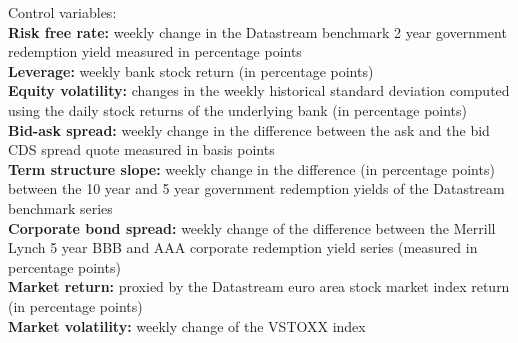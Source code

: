 \noindent
Control variables: \\
\textbf{Risk free rate:} weekly change in the Datastream benchmark 2 year government redemption yield measured in percentage points \\
\textbf{Leverage:} weekly bank stock return (in percentage points) \\
\textbf{Equity volatility:} changes in the weekly historical standard deviation computed using the daily stock returns of the underlying bank (in percentage points) \\
\textbf{Bid-ask spread:} weekly change in the difference between the ask and the bid CDS spread quote measured in basis points \\
\textbf{Term structure slope:} weekly change in the difference (in percentage points) between the 10 year and 5 year government redemption yields of the Datastream benchmark series \\
\textbf{Corporate bond spread:} weekly change of the difference between the Merrill Lynch 5 year BBB and AAA corporate redemption yield series (measured in percentage points) \\
\textbf{Market return:} proxied by the Datastream euro area stock market index return (in percentage points) \\
\textbf{Market volatility:} weekly change of the VSTOXX index

